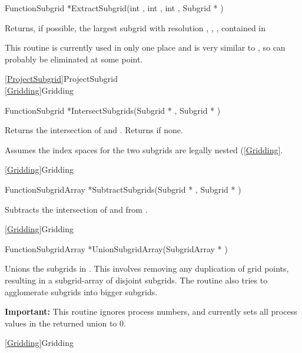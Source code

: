 {\newpage\clearpage
{}%
\begin{deftypefn}{Function}{Subgrid *}{ExtractSubgrid}(int , int , int , {Subgrid *} )
\par
\DESCRIPTION
Returns, if possible, the largest subgrid with resolution
, , ,
contained in 
\par
\NOTES
This routine is currently used in only one place and is very similar
to , so can probably be eliminated at some point.
\par
\SEEALSO
\vref{ProjectSubgrid}{ProjectSubgrid}\\
\vref{Gridding}{Gridding}
\par
\end{deftypefn}%
\lthtmlfigureZ
\lthtmlcheckvsize\clearpage}

{\newpage\clearpage
{}%
\begin{deftypefn}
{Function}{Subgrid *}{IntersectSubgrids}({Subgrid *} , {Subgrid *} )
\par
\DESCRIPTION
Returns the intersection of  and .
Returns  if none.
\par
\NOTES
Assumes the index spaces for the two subgrids are legally nested
(\ref{Gridding}.
\par
\SEEALSO
\vref{Gridding}{Gridding}
\par
\end{deftypefn}%
\lthtmlfigureZ
\lthtmlcheckvsize\clearpage}

{\newpage\clearpage
{}%
\begin{deftypefn}{Function}{SubgridArray *}{SubtractSubgrids}({Subgrid *} , {Subgrid *} )
\par
\DESCRIPTION
Subtracts the intersection of  and 
from .
\par
\SEEALSO
\vref{Gridding}{Gridding}
\par
\end{deftypefn}%
\lthtmlfigureZ
\lthtmlcheckvsize\clearpage}

{\newpage\clearpage
{}%
\begin{deftypefn}{Function}{SubgridArray *}{UnionSubgridArray}({SubgridArray *} )
\par
\DESCRIPTION
Unions the subgrids in .
This involves removing any duplication of grid points, resulting in
a subgrid-array of disjoint subgrids.
The routine also tries to agglomerate subgrids into bigger subgrids.
\par
\NOTES
{\bf Important:} This routine ignores process numbers, and currently
sets all process values in the returned union to 0.
\par
\SEEALSO
\vref{Gridding}{Gridding}
\par
\end{deftypefn}%
\lthtmlfigureZ
\lthtmlcheckvsize\clearpage}



